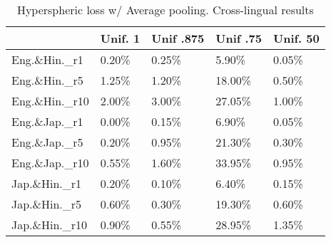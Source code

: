 
\begin{table}
    \centering
    \begin{tabular}{l|l|l|l|l}
        \toprule
        {} & Unif. 1 & Unif .875 & Unif .75 & Unif. 50 \\
        \midrule
        Eng.\&Hin.\_r1  &            0.20\% &                 0.25\% &                5.90\% &                0.05\% \\
        Eng.\&Hin.\_r5  &            1.25\% &                 1.20\% &               18.00\% &                0.50\% \\
        Eng.\&Hin.\_r10 &            2.00\% &                 3.00\% &               27.05\% &                1.00\% \\
        \midrule
        Eng.\&Jap.\_r1  &            0.00\% &                 0.15\% &                6.90\% &                0.05\% \\
        Eng.\&Jap.\_r5  &            0.20\% &                 0.95\% &               21.30\% &                0.30\% \\
        Eng.\&Jap.\_r10 &            0.55\% &                 1.60\% &               33.95\% &                0.95\% \\
        \midrule
        Jap.\&Hin.\_r1  &            0.20\% &                 0.10\% &                6.40\% &                0.15\% \\
        Jap.\&Hin.\_r5  &            0.60\% &                 0.30\% &               19.30\% &                0.60\% \\
        Jap.\&Hin.\_r10 &            0.90\% &                 0.55\% &               28.95\% &                1.35\% \\
        \bottomrule
\end{tabular}


\caption{Hyperspheric loss  w/ Average pooling. Cross-lingual results}
\label{table:hyper_cling}
\end{table}
